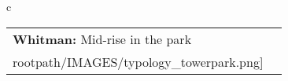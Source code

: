 \begin{table}[H]
        \begin{tabular}{c}
        \begin{tabular}{m{1.5in} m{2in}}
\textbf{Whitman:} {Mid-rise in the park} & \texttt{[image: \\rootpath/IMAGES/typology\_towerpark.png]}
\end{tabular}\end{tabular}
        \end{table}
